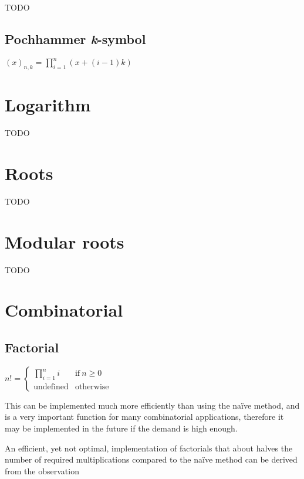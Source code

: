 TODO


\subsection{Pochhammer \emph{k}-symbol}
\label{sec:Pochhammer k-symbol}

\( \displaystyle{
    (x)_{n,k} = \prod_{i = 1}^n (x + (i - 1)k)
}\)


\newpage
\section{Logarithm}
\label{sec:Logarithm}

TODO


\newpage
\section{Roots}
\label{sec:Roots}

TODO


\newpage
\section{Modular roots}
\label{sec:Modular roots}

TODO %


\newpage
\section{Combinatorial}
\label{sec:Combinatorial}

\subsection{Factorial}
\label{sec:Factorial}

\( \displaystyle{
    n! = \left \lbrace \begin{array}{ll}
        \displaystyle{\prod_{i = 1}^n i} & \textrm{if}~ n \ge 0 \\
        \textrm{undefined} & \textrm{otherwise}
    \end{array} \right .
}\)
\vspace{1em}

This can be implemented much more efficiently
than using the naïve method, and is a very
important function for many combinatorial
applications, therefore it may be implemented
in the future if the demand is high enough.

An efficient, yet not optimal, implementation
of factorials that about halves the number of
required multiplications compared to the naïve
method can be derived from the observation

